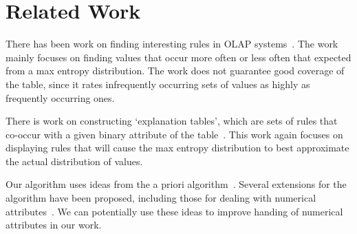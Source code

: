 \documentclass{sig-alternate}
\begin{document}
\section{Related Work}
There has been work on finding interesting rules in OLAP systems~\cite{Sarawagi:2001:UMA:767141.767148, Sarawagi00user-adaptiveexploration, Sarawagi98discovery-drivenexploration}. The work mainly focuses on finding values that occur more often or less often that expected from a max entropy distribution. The work does not guarantee good coverage of the table, since it rates infrequently occurring sets of values as highly as frequently occurring ones. 

There is work on constructing `explanation tables', which are sets of rules that co-occur with a given binary attribute of the table~\cite{DBLP:journals/pvldb/GebalyAGKS14}. This work again focuses on displaying rules that will cause the max entropy distribution to best approximate the actual distribution of values. 

Our algorithm uses ideas from the a priori algorithm~\cite{apriori}. Several extensions for the algorithm have been proposed, including those for dealing with numerical attributes~\cite{Srikant:1996:MQA:233269.233311}. We can potentially use these ideas to improve handing of numerical attributes in our work. 

{\small 


}
\end{document}
